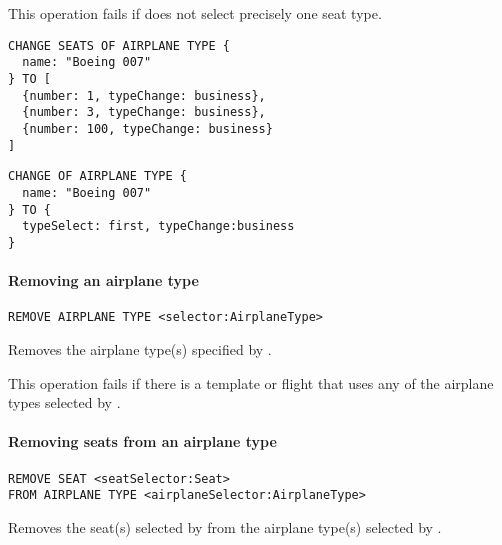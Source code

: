 This operation fails if  does not select precisely one seat type.

\begin{texa}
  {
  \begin{lstlisting}
CHANGE SEATS OF AIRPLANE TYPE {
  name: "Boeing 007"
} TO [
  {number: 1, typeChange: business},
  {number: 3, typeChange: business},
  {number: 100, typeChange: business}
]
  \end{lstlisting}
  }
\end{texa}

\begin{texa}
  {
  \begin{lstlisting}
CHANGE OF AIRPLANE TYPE {
  name: "Boeing 007"
} TO {
  typeSelect: first, typeChange:business
}
  \end{lstlisting}
  }
\end{texa}
\paragraph{Removing an airplane type}
\begin{operation}
  \lstinline|REMOVE AIRPLANE TYPE <selector:AirplaneType>|
\end{operation}
Removes the airplane type(s) specified by . 

This operation fails if there is a template or flight that uses any of the
airplane types selected by .

\paragraph{Removing seats from an airplane type}
\begin{operation}
  \begin{lstlisting}
REMOVE SEAT <seatSelector:Seat>
FROM AIRPLANE TYPE <airplaneSelector:AirplaneType>
  \end{lstlisting}
\end{operation}
Removes the seat(s) selected by  from the airplane type(s)
selected by .

